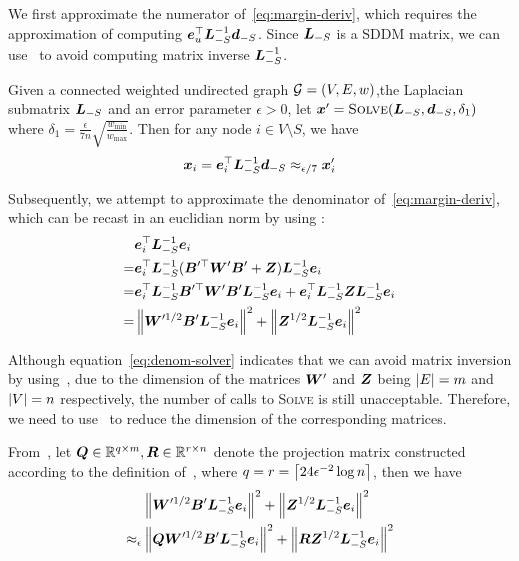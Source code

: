 \documentclass[sigconf]{acmart}
\begin{document}
We first approximate the numerator of~\eqref{eq:margin-deriv}, which requires the approximation of computing \(\boldsymbol{e}_u^\top\boldsymbol{L}_{-S}^{-1}\boldsymbol{d}_{-S}\).
Since \(\boldsymbol{L}_{-S}\) is a SDDM matrix, we can use~ to avoid computing matrix inverse \(\boldsymbol{L}_{-S}^{-1}\).
\begin{lemma}\label{lem:approx-numer}
    Given a connected weighted undirected graph \(\mathcal{G}=(V,E,w)\),the Laplacian submatrix \(\boldsymbol{L}_{-S}\) and an error parameter \(\epsilon>0\), let \(\boldsymbol{x}'=\textsc{Solve}(\boldsymbol{L}_{-S},\boldsymbol{d}_{-S},\delta_1)\) where \(\delta_1=\frac{\epsilon}{7n}\sqrt{\frac{w_{\min}}{w_{\max}}}\). Then for any node \(i\in V\setminus S\), we have
    \begin{equation}\label{eq:approx-numer}
        \boldsymbol{x}_i=\boldsymbol{e}_i^\top\boldsymbol{L}_{-S}^{-1}\boldsymbol{d}_{-S}\approx_{\epsilon/7}\boldsymbol{x}'_i
    \end{equation}
\end{lemma}



Subsequently, we attempt to approximate the denominator of~\eqref{eq:margin-deriv}, which can be recast in an euclidian norm by using :
\begin{equation}\label{eq:denom-solver}
    \begin{split}
        &\boldsymbol{e}_i^\top\boldsymbol{L}_{-S}^{-1}\boldsymbol{e}_i\\
        =&\boldsymbol{e}_i^\top\boldsymbol{L}_{-S}^{-1}(\boldsymbol{B}'^\top\boldsymbol{W}'\boldsymbol{B}'+\boldsymbol{Z})\boldsymbol{L}_{-S}^{-1}\boldsymbol{e}_i\\
        =&\boldsymbol{e}_i^\top\boldsymbol{L}_{-S}^{-1}\boldsymbol{B}'^\top\boldsymbol{W}'\boldsymbol{B}'\boldsymbol{L}_{-S}^{-1}\boldsymbol{e}_i+\boldsymbol{e}_i^\top\boldsymbol{L}_{-S}^{-1}\boldsymbol{Z}\boldsymbol{L}_{-S}^{-1}\boldsymbol{e}_i\\
        =&\left\Vert\boldsymbol{W}'^{1/2}\boldsymbol{B}'\boldsymbol{L}_{-S}^{-1}\boldsymbol{e}_i\right\Vert^2+\left\Vert\boldsymbol{Z}^{1/2}\boldsymbol{L}_{-S}^{-1}\boldsymbol{e}_i\right\Vert^2
    \end{split}
\end{equation}

Although equation~\eqref{eq:denom-solver} indicates that we can avoid matrix inversion by using~, due to the dimension of the matrices \(\boldsymbol{W}'\) and \(\boldsymbol{Z}\) being \(\left|E \right|=m\) and \(\left|V \right|=n\) respectively, the number of calls to \textsc{Solve} is still unacceptable.
Therefore, we need to use~ to reduce the dimension of the corresponding matrices.

From~, let \(\boldsymbol{Q}\in\mathbb{R}^{q\times m},\boldsymbol{R}\in\mathbb{R}^{r\times n}\) denote the projection matrix constructed according to the definition of~, where \(q=r=\left\lceil24\epsilon^{-2}\log n\right\rceil\), then we have
\begin{equation}\label{eq:denom-jl}
    \begin{split}
        &\left\Vert\boldsymbol{W}'^{1/2}\boldsymbol{B}'\boldsymbol{L}_{-S}^{-1}\boldsymbol{e}_i\right\Vert^2+\left\Vert\boldsymbol{Z}^{1/2}\boldsymbol{L}_{-S}^{-1}\boldsymbol{e}_i\right\Vert^2\\
        \approx_\epsilon&\left\Vert\boldsymbol{Q}\boldsymbol{W}'^{1/2}\boldsymbol{B}'\boldsymbol{L}_{-S}^{-1}\boldsymbol{e}_i\right\Vert^2+\left\Vert\boldsymbol{R}\boldsymbol{Z}^{1/2}\boldsymbol{L}_{-S}^{-1}\boldsymbol{e}_i\right\Vert^2
    \end{split}
\end{equation}
\end{document}
